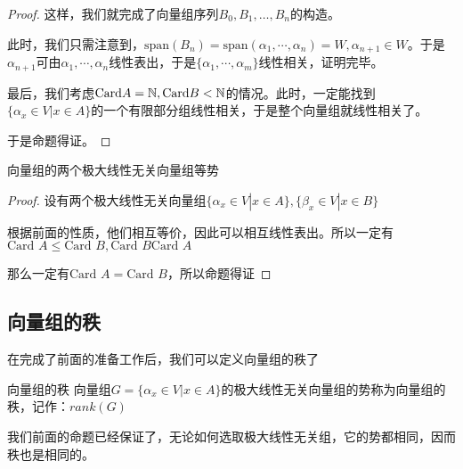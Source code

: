 \documentclass[12pt, a4paper, oneside, UTF8]{ctexbook}
\begin{document}
\begin{para}{0}
\begin{proof}
						这样，我们就完成了向量组序列$B_0, B_1, \dots, B_n$的构造。
						
						此时，我们只需注意到，$\text{span}(B_n)=\text{span}(\alpha_1,\cdots,\alpha _n)=W,\alpha_{n+1} \in W$。于是$\alpha_{n+1}$可由$\alpha_1,\cdots,\alpha_n$线性表出，于是$\{\alpha_1,\cdots,\alpha_m\}$线性相关，证明完毕。

						最后，我们考虑$\text{Card} A = \mathbb{N},\text{Card} B < \mathbb{N}$的情况。此时，一定能找到$\{\alpha_x \in V | x \in A\}$的一个有限部分组线性相关，于是整个向量组就线性相关了。

						于是命题得证。
					\end{proof}
					\begin{proposition}
						向量组的两个极大线性无关向量组等势
					\end{proposition}
					\begin{proof}
						设有两个极大线性无关向量组$\{\alpha_x \in V| x\in A\},\{\beta_x \in V| x \in B\}$

						根据前面的性质，他们相互等价，因此可以相互线性表出。所以一定有$\text{Card }A \leqslant \text{Card }B,\text{Card }B \text{Card }A$

						那么一定有$\text{Card }A = \text{Card }B$，所以命题得证
					\end{proof}
			\end{para}
		\subsection{向量组的秩}
			在完成了前面的准备工作后，我们可以定义向量组的秩了
			\begin{defn}{向量组的秩}{}
				向量组$G=\{\alpha_x \in V| x \in A\}$的极大线性无关向量组的势称为向量组的秩，记作：$rank(G)$
			\end{defn}
			我们前面的命题已经保证了，无论如何选取极大线性无关组，它的势都相同，因而秩也是相同的。
			
\end{document}
